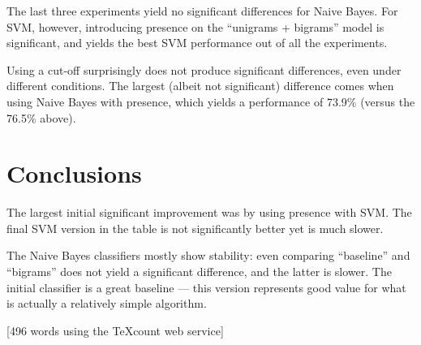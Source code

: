 \documentclass[12pt,a4paper,twoside]{article}
\begin{document}
The last three experiments yield no significant differences for Naive Bayes. For SVM, however, introducing presence on the ``unigrams + bigrams'' model is significant, and yields the best SVM performance out of all the experiments.

Using a cut-off surprisingly does not produce significant differences, even under different conditions. The largest (albeit not significant) difference comes when using Naive Bayes with presence, which yields a performance of 73.9\% (versus the 76.5\% above).


\section{Conclusions}

The largest initial significant improvement was by using presence with SVM. The final SVM version in the table is not significantly better yet is much slower.

The Naive Bayes classifiers mostly show stability: even comparing ``baseline'' and ``bigrams'' does not yield a significant difference, and the latter is slower. The initial classifier is a great baseline --- this version represents good value for what is actually a relatively simple algorithm.

\vspace{16px}

[496 words using the TeXcount web service]
\end{document}
